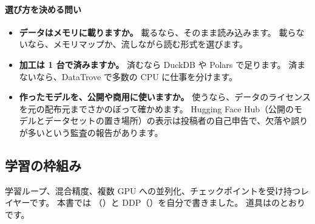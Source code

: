 \paragraph{選び方を決める問い}
\begin{itemize}[nosep,beginpenalty=10000]
\item \textbf{データはメモリに載りますか。}
  載るなら、そのまま読み込みます。
  載らないなら、メモリマップか、流しながら読む形式を選びます。
\item \textbf{加工は 1 台で済みますか。}
  済むなら DuckDB や Polars で足ります。
  済まないなら、DataTrove で多数の CPU に仕事を分けます。
\item \textbf{作ったモデルを、公開や商用に使いますか。}
  使うなら、データのライセンスを元の配布元までさかのぼって確かめます。
  Hugging Face Hub（公開のモデルとデータセットの置き場所）の表示は投稿者の自己申告で、欠落や誤りが多いという監査の報告があります。
\end{itemize}

\subsection{学習の枠組み}\label{sec:tm-train}

学習ループ、混合精度、複数 GPU への並列化、チェックポイントを受け持つレイヤーです。
本書では （）と DDP（）を自分で書きました。
道具はのとおりです。

